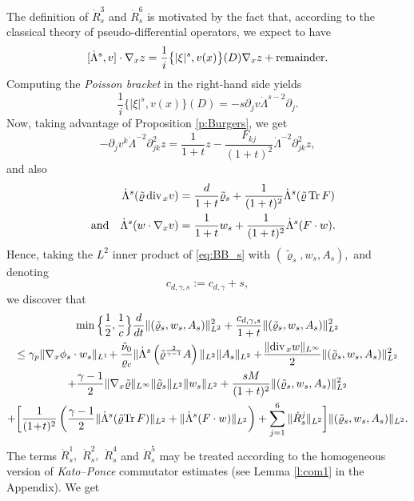 \documentclass[11pt,twoside]{amsart}
\newcommand{\tildrho}{\tilde{\varrho}}
\renewcommand{\div}{\mbox{\rm div}\;\!}
\newcommand{\andf}{\quad\hbox{and}\quad}
\begin{document}
The definition of $\dot R^3_s$ and $\dot R^6_s$ is motivated
by the fact that, according to  the classical  theory of pseudo-differential operators, we  expect to have 
$$
[\dot \Lambda^s,v]\cdot\nabla_x z=\frac1i\bigl\{|\xi|^s,v(x)\bigr\}(D)\nabla_x z +\hbox{remainder}.
$$
Computing  the \emph{Poisson bracket}  in the right-hand side  yields  
 $$
 \frac1i\bigl\{|\xi|^s,v(x)\bigr\}(D) = - s \partial_j v \dot\Lambda^{s-2} \partial_j.
 $$
 Now, taking advantage of 
 Proposition \ref{p:Burgers}, we get 
$$-\partial_j v^k\dot\Lambda^{-2}\partial^2_{jk}z=\frac1{1+t}z-\frac{F_{kj}}{(1+t)^2}\dot\Lambda^{-2}\partial^2_{jk}z,
$$
and also
$$\begin{aligned}
\dot\Lambda^s(\tildrho\,\div_x v)&=\frac d{1+t}\tildrho_s+\frac1{(1+t)^2}\dot\Lambda^s(\tildrho\,{\rm Tr}\, F)\\
\andf \dot \Lambda^s(w\cdot\nabla_x v)&=\frac1{1+t}w_s+\frac1{(1+t)^2}\dot\Lambda^s(F\cdot w).\end{aligned}$$
Hence, taking the $L^2$ inner product of \eqref{eq:BB_s} with $(\tildrho_s,w_s,A_s),$  and denoting 
\begin{equation}\label{eq:cdgs}c_{d,\gamma,s}:= c_{d,\gamma}+s,\end{equation}
 we discover that 
\begin{multline}\label{eq:Hs}
\min\Big\{\frac12,\frac1c\Big\}\frac d{dt}\|(\tildrho_s,w_s,A_s)\|_{L^2}^2
+\frac{c_{d,\gamma,s}}{1+t}\|(\tildrho_s,w_s,A_s)\|_{L^2}^2\\
\leq
\gamma_p\|\nabla_x\phi_s\cdot w_s\|_{L^1}\!
+\frac{\tilde \nu_0}{\varrho_c}\|\dot\Lambda^s\left(\tildrho^{\frac{2}{\gamma-1}} A\right)\|_{L^2}\|A_s\|_{L^2}
+\!\frac{\|\div_x
  w\|_{L^\infty}}2\|(\tildrho_s,w_s,A_s)\|_{L^2}^2 \\
  +\frac{\gamma-1}2\|\nabla_x \tildrho\|_{L^\infty}\|\tildrho_s\|_{L^2}\|w_s\|_{L^2}
+\frac{sM}{(1+t)^2} \|(\tildrho_s,w_s,A_s)\|_{L^2}^2\\+
\biggl[\frac{1}{(1\!+\!t)^2}\left(\frac{\gamma-1}2\|\dot\Lambda^s(\tildrho{\rm Tr}\, F)\|_{L^2}+\|\dot\Lambda^s(F\cdot w)\|_{L^2}\right) 
+\sum_{j=1}^6\|\dot R_s^j\|_{L^2}\biggr]\|(\tildrho_s,w_s,A_s)\|_{L^2}.
\end{multline}
The  terms $\dot R_s^1,$ $\dot R_s^2,$ $\dot R_s^4$ and $\dot R_s^5$  may be treated according to the homogeneous  version  of {\em Kato--Ponce} commutator estimates (see Lemma \ref{l:com1} in  the Appendix). 
We get
\end{document}

